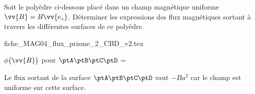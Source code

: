
\finEntrainement







\hauteurLargeurCadreReponse		{8mm}{2.3cm}
\typeEntrainement				{} %
\initialisationEntrainement

Soit le polyèdre ci-dessous placé dans un champ magnétique uniforme $\vv{B} = B\vv{e_z}$.
Déterminer les expressions des flux magnétiques sortant à travers les différentes surfaces de ce polyèdre.

\begin{center}
{fiche_MAG04_flux_prisme_2_CBD_v2.tex}
\end{center}

\debutEntrainement


\begin{enonce}
$\phi \big(\vv{B} \big)$ pour $\ptA\ptB\ptC\ptD$ =
\end{enonce}

\begin{corrige}
Le flux sortant de la surface $\ptA\ptB\ptC\ptD$ vaut $-Ba^{2}$ car le champ est uniforme sur cette surface.
\end{corrige}




